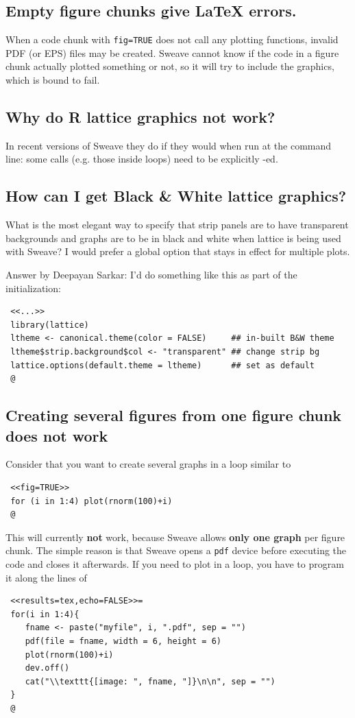 \documentclass[a4paper]{article}
\begin{document}
   \subsection{Empty figure chunks give \LaTeX{} errors.}

   When a code chunk with \texttt{fig=TRUE} does not call any plotting
   functions, invalid PDF (or EPS) files may be created. Sweave cannot
   know if the code in a figure chunk actually plotted something or
   not, so it will try to include the graphics, which is bound to
   fail.

   \subsection{Why do R lattice graphics not work?}

   In recent versions of Sweave they do if they would when run at the
   command line: some calls (e.g.{} those inside loops) need to be
   explicitly -ed.

   \subsection{How can I get Black \& White lattice graphics?}

   What is the most elegant way to specify that strip panels are to have
   transparent backgrounds and graphs are to be in black and white when
   lattice is being used with Sweave?  I would prefer a global option that
   stays in effect for multiple plots.

   Answer by Deepayan Sarkar: I'd do something like this as part of
   the initialization:
\begin{verbatim}
 <<...>>
 library(lattice)
 ltheme <- canonical.theme(color = FALSE)     ## in-built B&W theme
 ltheme$strip.background$col <- "transparent" ## change strip bg
 lattice.options(default.theme = ltheme)      ## set as default
 @
\end{verbatim}

  \subsection{Creating several figures from one figure chunk does
     not work}

   Consider that you want to create several graphs in a loop similar
   to
\begin{verbatim}
 <<fig=TRUE>>
 for (i in 1:4) plot(rnorm(100)+i)
 @
\end{verbatim}
   This will currently \textbf{not} work, because Sweave allows
   \textbf{only one graph} per figure chunk. The simple reason is that
   Sweave opens a \texttt{pdf} device before executing the code and
   closes it afterwards. If you need to plot in a loop, you have to
   program it along the lines of
\begin{verbatim}
 <<results=tex,echo=FALSE>>=
 for(i in 1:4){
    fname <- paste("myfile", i, ".pdf", sep = "")
    pdf(file = fname, width = 6, height = 6)
    plot(rnorm(100)+i)
    dev.off()
    cat("\\texttt{[image: ", fname, "]}\n\n", sep = "")
 }
 @
\end{verbatim}
\end{document}
